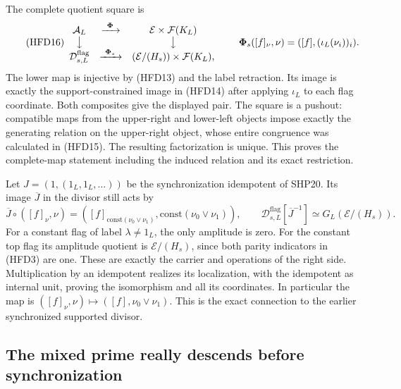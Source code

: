 The complete quotient square is
\begin{equation}\tag{HFD16}
 \begin{array}{ccc}
 \mathcal A_L&\xrightarrow{\ \boldsymbol\Phi\ }&
               \mathcal E\times\mathcal F(K_L)\\
 \big\downarrow&&\big\downarrow\\
 \mathcal D^{\mathrm{flag}}_{s,L}&
 \xrightarrow{\ \boldsymbol\Phi_s\ }&
               (\mathcal E/(H_s))\times\mathcal F(K_L),
 \end{array}
 \qquad
 \boldsymbol\Phi_s([f]_\nu,\nu)
         =([f],(\iota_L(\nu_i))_i).
\end{equation}
The lower map is injective by (HFD13) and the
label retraction. Its image is exactly the
support-constrained image in (HFD14) after
applying $\iota_L$ to each flag coordinate.
Both composites give the displayed pair.
The square is a pushout: compatible maps from
the upper-right and lower-left objects impose
exactly the generating relation on the upper-right
object, whose entire congruence was calculated
in (HFD15). The resulting factorization is unique.
This proves the complete-map statement including
the induced relation and its exact restriction.

Let $J=(1,(1_L,1_L,\ldots))$ be the synchronization
idempotent of SHP20. Its image $\overline J$ in
the divisor still acts by
\begin{equation}\tag{HFD17}
 \overline J\circ([f]_\nu,\nu)
       =([f]_{\mathrm{const}(\nu_0\vee\nu_1)},
                        \mathrm{const}(\nu_0\vee\nu_1)),\qquad
 \mathcal D^{\mathrm{flag}}_{s,L}[\overline J^{-1}]
                 \simeq G_L(\mathcal E/(H_s)).
\end{equation}
For a constant flag of label $\lambda\ne1_L$,
the only amplitude is zero. For the constant
top flag its amplitude quotient is
$\mathcal E/(H_s)$, since both parity indicators
in (HFD3) are one. These are exactly the
carrier and operations of the right side.
Multiplication by an idempotent realizes its
localization, with the idempotent as internal
unit, proving the isomorphism and all its
coordinates. In particular the map is
$([f]_\nu,\nu)\mapsto([f],\nu_0\vee\nu_1)$.
This is the exact connection to the earlier
synchronized supported divisor.

\subsection{The mixed prime really descends before synchronization}

